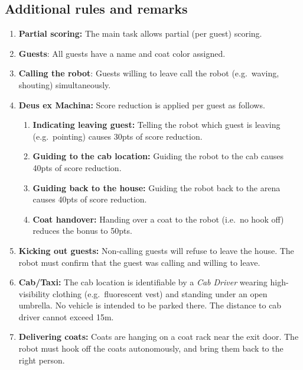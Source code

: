 \subsection*{Additional rules and remarks}
\begin{enumerate}[nosep]
	\item \textbf{Partial scoring:} The main task allows partial (per guest) scoring.

	\item \textbf{Guests}: All guests have a name and coat color assigned.

	\item \textbf{Calling the robot}: Guests willing to leave call the robot (e.g.~waving, shouting) simultaneously.

	\item \textbf{Deus ex Machina:} Score reduction is applied per guest as follows.
	\begin{enumerate}[nosep]
		\item \textbf{Indicating leaving guest:} Telling the robot which guest is leaving (e.g.~pointing) causes 30pts of score reduction.

		\item \textbf{Guiding to the cab location:} Guiding the robot to the cab causes 40pts of score reduction.

		\item \textbf{Guiding back to the house:} Guiding the robot back to the arena causes 40pts of score reduction.

		\item \textbf{Coat handover:} Handing over a coat to the robot (i.e.~no hook off) reduces the bonus to 50pts.
	\end{enumerate}

	\item \textbf{Kicking out guests:} Non-calling guests will refuse to leave the house. The robot must confirm that the guest was calling and willing to leave.

	\item \textbf{Cab/Taxi:} The cab location is identifiable by a \emph{Cab Driver} wearing high-visibility clothing (e.g.~fluorescent vest) and standing under an open umbrella.
	No vehicle is intended to be parked there.
	The distance to cab driver cannot exceed 15m.

	\item \textbf{Delivering coats:} Coats are hanging on a coat rack near the exit door.
	The robot must hook off the coats autonomously, and bring them back to the right person.
\end{enumerate}


